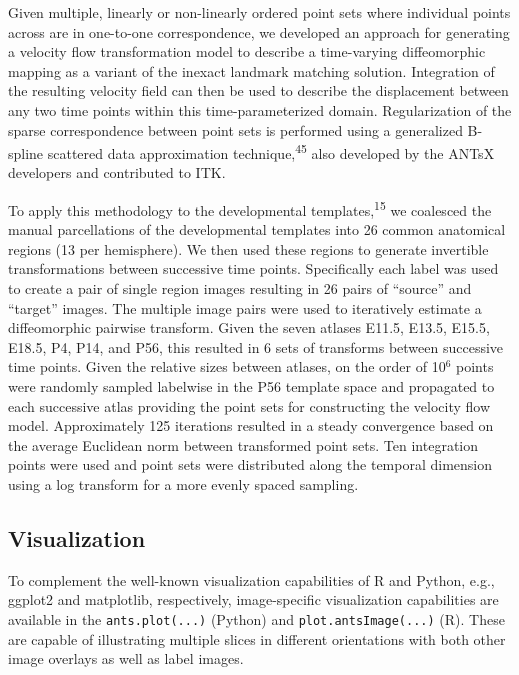 \documentclass[
  12pt,
]{article}
\begin{document}
Given multiple, linearly or non-linearly ordered point sets where
individual points across are in one-to-one correspondence, we developed
an approach for generating a velocity flow transformation model to
describe a time-varying diffeomorphic mapping as a variant of the
inexact landmark matching solution. Integration of the resulting
velocity field can then be used to describe the displacement between any
two time points within this time-parameterized domain. Regularization of
the sparse correspondence between point sets is performed using a
generalized B-spline scattered data approximation
technique,\textsuperscript{45} also developed by the ANTsX developers
and contributed to ITK.

To apply this methodology to the developmental
templates,\textsuperscript{15} we coalesced the manual parcellations of
the developmental templates into 26 common anatomical regions (13 per
hemisphere). We then used these regions to generate invertible
transformations between successive time points. Specifically each label
was used to create a pair of single region images resulting in 26 pairs
of ``source'' and ``target'' images. The multiple image pairs were used
to iteratively estimate a diffeomorphic pairwise transform. Given the
seven atlases E11.5, E13.5, E15.5, E18.5, P4, P14, and P56, this
resulted in 6 sets of transforms between successive time points. Given
the relative sizes between atlases, on the order of 10\(^6\) points were
randomly sampled labelwise in the P56 template space and propagated to
each successive atlas providing the point sets for constructing the
velocity flow model. Approximately 125 iterations resulted in a steady
convergence based on the average Euclidean norm between transformed
point sets. Ten integration points were used and point sets were
distributed along the temporal dimension using a log transform for a
more evenly spaced sampling.

\hypertarget{visualization}{%
\subsection*{Visualization}\label{visualization}}

To complement the well-known visualization capabilities of R and Python,
e.g., ggplot2 and matplotlib, respectively, image-specific visualization
capabilities are available in the \texttt{ants.plot(...)} (Python) and
\texttt{plot.antsImage(...)} (R). These are capable of illustrating
multiple slices in different orientations with both other image overlays
as well as label images.
\end{document}
